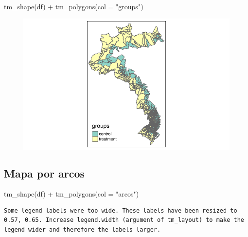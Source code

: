 \documentclass[
  letterpaper,
  DIV=11,
  numbers=noendperiod]{scrartcl}
\newenvironment{Shaded}{\begin{snugshade}}{\end{snugshade}}
\newcommand{\AttributeTok}[1]{\textcolor[rgb]{0.40,0.45,0.13}{#1}}
\newcommand{\FunctionTok}[1]{\textcolor[rgb]{0.28,0.35,0.67}{#1}}
\newcommand{\NormalTok}[1]{\textcolor[rgb]{0.00,0.23,0.31}{#1}}
\newcommand{\SpecialCharTok}[1]{\textcolor[rgb]{0.37,0.37,0.37}{#1}}
\newcommand{\StringTok}[1]{\textcolor[rgb]{0.13,0.47,0.30}{#1}}
\begin{document}
\begin{Shaded}
\begin{Highlighting}[]
\FunctionTok{tm\_shape}\NormalTok{(df) }\SpecialCharTok{+} \FunctionTok{tm\_polygons}\NormalTok{(}\AttributeTok{col =} \StringTok{"groups"}\NormalTok{)}
\end{Highlighting}
\end{Shaded}

\begin{figure}[H]

{\centering \includegraphics{maps_files/figure-pdf/unnamed-chunk-8-1.pdf}

}

\end{figure}

\hypertarget{mapa-por-arcos}{%
\subsection{Mapa por arcos}\label{mapa-por-arcos}}

\begin{Shaded}
\begin{Highlighting}[]
\FunctionTok{tm\_shape}\NormalTok{(df) }\SpecialCharTok{+} \FunctionTok{tm\_polygons}\NormalTok{(}\AttributeTok{col =} \StringTok{"arcos"}\NormalTok{)}
\end{Highlighting}
\end{Shaded}

\begin{verbatim}
Some legend labels were too wide. These labels have been resized to 0.57, 0.65. Increase legend.width (argument of tm_layout) to make the legend wider and therefore the labels larger.
\end{verbatim}
\end{document}
